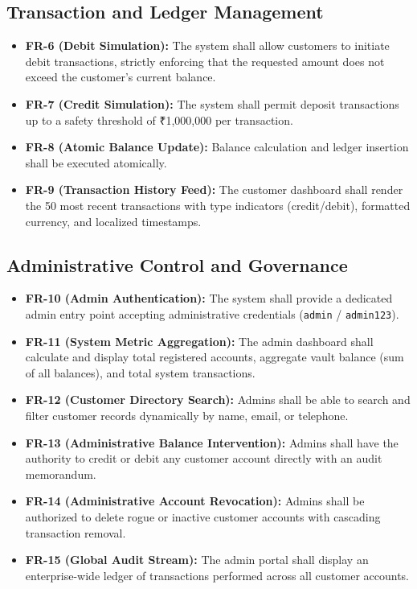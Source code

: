 \subsection{Transaction and Ledger Management}
\begin{itemize}
    \item \textbf{FR-6 (Debit Simulation):} The system shall allow customers to initiate debit transactions, strictly enforcing that the requested amount does not exceed the customer's current balance.
    \item \textbf{FR-7 (Credit Simulation):} The system shall permit deposit transactions up to a safety threshold of ₹1,000,000 per transaction.
    \item \textbf{FR-8 (Atomic Balance Update):} Balance calculation and ledger insertion shall be executed atomically.
    \item \textbf{FR-9 (Transaction History Feed):} The customer dashboard shall render the 50 most recent transactions with type indicators (credit/debit), formatted currency, and localized timestamps.
\end{itemize}

\subsection{Administrative Control and Governance}
\begin{itemize}
    \item \textbf{FR-10 (Admin Authentication):} The system shall provide a dedicated admin entry point accepting administrative credentials (\texttt{admin} / \texttt{admin123}).
    \item \textbf{FR-11 (System Metric Aggregation):} The admin dashboard shall calculate and display total registered accounts, aggregate vault balance (sum of all balances), and total system transactions.
    \item \textbf{FR-12 (Customer Directory Search):} Admins shall be able to search and filter customer records dynamically by name, email, or telephone.
    \item \textbf{FR-13 (Administrative Balance Intervention):} Admins shall have the authority to credit or debit any customer account directly with an audit memorandum.
    \item \textbf{FR-14 (Administrative Account Revocation):} Admins shall be authorized to delete rogue or inactive customer accounts with cascading transaction removal.
    \item \textbf{FR-15 (Global Audit Stream):} The admin portal shall display an enterprise-wide ledger of transactions performed across all customer accounts.
\end{itemize}

